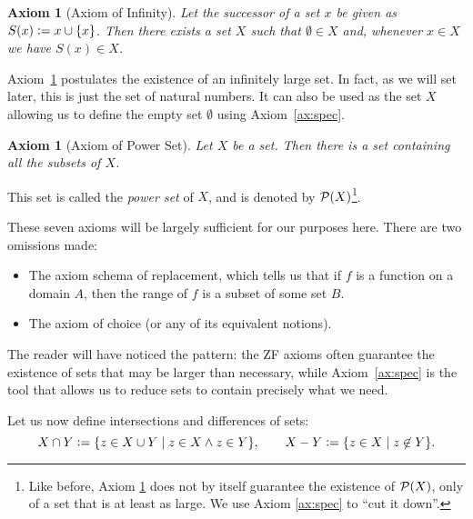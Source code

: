 \documentclass[a4paper, twoside, notitlepage, 11pt]{article}
\theoremstyle{plain}
\newtheorem{ax}[prop]{Axiom}
\theoremstyle{definition}
\theoremstyle{remark}
\numberwithin{equation}{section}
\begin{document}
\begin{ax}[Axiom of Infinity] \label{ax:inf}
Let the {\em successor} of a set $x$ be given as $S(x) \vcentcolon= x \cup \{x\}$. Then there exists a set $X$ such that
$\emptyset\in X$ and, whenever $x\in X$ we have $S(x)\in X$.
\end{ax}

Axiom~\ref{ax:inf} postulates the existence of an infinitely large set. In fact, as we will set later, this is
just the set of natural numbers. It can also be used as the set $X$ allowing us to define the empty set
$\emptyset$ using Axiom~\ref{ax:spec}.

\begin{ax}[Axiom of Power Set] \label{ax:pow}
Let $X$ be a set. Then there is a set containing all the subsets of $X$.
\end{ax}

This set is called the {\em power set} of $X$, and is denoted by $\mathcal{P}(X)$\footnote{Like before, Axiom
\ref{ax:pow} does not by itself guarantee the existence of $\mathcal{P}(X)$, only of a set that is at least as large.
We use Axiom \ref{ax:spec} to ``cut it down''.}.

These seven axioms will be largely sufficient for our purposes here. There are two omissions made:
\begin{itemize}
    \item The axiom schema of replacement, which tells us that if $f$ is a function on a domain $A$, then the
    range of $f$ is a subset of some set $B$.
    \item The axiom of choice (or any of its equivalent notions).
\end{itemize}
The reader will have noticed the pattern: the ZF axioms often guarantee the existence of sets that may be
larger than necessary, while Axiom~\ref{ax:spec} is the tool that allows us to reduce sets to contain
precisely what we need.

Let us now define intersections and differences of sets:
\[
    X \cap Y \vcentcolon= \{ z \in X \cup Y \;|\; z \in X \wedge z \in Y \}, \qquad
    X - Y \vcentcolon= \{ z \in X \;|\; z \not\in Y \}.
\]

\end{document}
